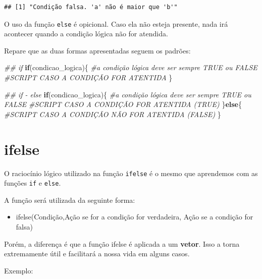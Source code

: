 \documentclass[
]{book}
\newenvironment{Shaded}{\begin{snugshade}}{\end{snugshade}}
\newcommand{\CommentTok}[1]{\textcolor[rgb]{0.56,0.35,0.01}{\textit{#1}}}
\newcommand{\ControlFlowTok}[1]{\textcolor[rgb]{0.13,0.29,0.53}{\textbf{#1}}}
\newcommand{\NormalTok}[1]{#1}
\providecommand{\tightlist}{%
  \setlength{\itemsep}{0pt}\setlength{\parskip}{0pt}}
\begin{document}
\begin{verbatim}
## [1] "Condição falsa. 'a' não é maior que 'b'"
\end{verbatim}

O uso da função \texttt{else} é opicional. Caso ela não esteja presente,
nada irá acontecer quando a condição lógica não for atendida.

Repare que as duas formas apresentadas seguem os padrões:

\begin{Shaded}
\begin{Highlighting}[]
\CommentTok{## if}
\ControlFlowTok{if}\NormalTok{(condicao_logica)\{ }\CommentTok{#a condição lógica deve ser sempre TRUE ou FALSE}
  \CommentTok{#SCRIPT CASO A CONDIÇÃO FOR ATENTIDA}
\NormalTok{\}}
\end{Highlighting}
\end{Shaded}

\begin{Shaded}
\begin{Highlighting}[]
\CommentTok{## if - else}
\ControlFlowTok{if}\NormalTok{(condicao_logica)\{ }\CommentTok{#a condição lógica deve ser sempre TRUE ou FALSE}
  \CommentTok{#SCRIPT CASO A CONDIÇÃO FOR ATENTIDA (TRUE)}
\NormalTok{\}}\ControlFlowTok{else}\NormalTok{\{}
    \CommentTok{#SCRIPT CASO A CONDIÇÃO NÃO FOR ATENTIDA (FALSE)}
\NormalTok{\}}
\end{Highlighting}
\end{Shaded}

\hypertarget{ifelse}{%
\section{ifelse}\label{ifelse}}

O raciocínio lógico utilizado na função \texttt{ifelse} é o mesmo que
aprendemos com as funções \texttt{if} e \texttt{else}.

A função será utilizada da seguinte forma:

\begin{itemize}
\tightlist
\item
  ifelse(Condição,Ação se for a condição for verdadeira, Ação se a
  condição for falsa)
\end{itemize}

Porém, a diferença é que a função ifelse é aplicada a um \textbf{vetor}.
Isso a torna extremamente útil e facilitará a nossa vida em alguns
casos.

Exemplo:
\end{document}
